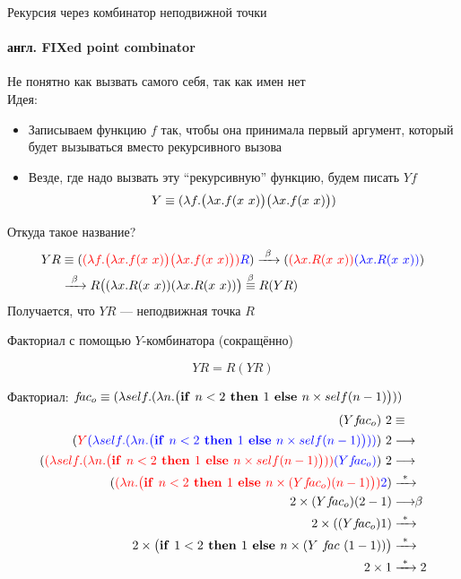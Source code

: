 \newcommand\Y{\ensuremath{Y}}
\begin{frame}{Рекурсия через комбинатор неподвижной точки}
\framesubtitle{англ. FIXed point combinator}
\def\Yimpl{\ensuremath{\lam{f}{\Lam{x}{f(x\ x)}\Lam{x}{f(x\ x)}}}}
Не понятно как вызвать самого себя, так как имен нет\\

Идея:
\begin{itemize}
  \item Записываем функцию $f$ так, чтобы она принимала первый аргумент, который будет вызываться вместо рекурсивного вызова
  \item Везде, где надо вызвать эту \enquote{рекурсивную} функцию, будем писать $Yf$
\vspace{-0.5em}
  {\Large\begin{align*}
     Y\equiv \Yimpl
  \end{align*}}
\end{itemize}

Откуда такое название?
\begin{align*}
YR &\equiv     \redex{\Yimpl}{R} \arrbeta \redex{\lam{x}{R(x\ x)}}{\lam{x}{R(x\ x)}} \\
&\arrbeta  R\big( \lam{x}{R(x\ x)}\lam{x}{R(x\ x)} \big)   \overset{\beta}{\equiv} R(YR)
\end{align*}
Получается, что $YR$ --- неподвижная точка $R$
\end{frame}


\newcommand{\ite}[3]{\ensuremath{\big{(}\text{\textbf{if }} #1\text{\textbf{ then }}#2\text{\textbf{ else }}#3}\big{)}}
\newcommand{\FIX}{\texttt{FIX}}
\newcommand{\self}{\ensuremath{self}}

\begin{frame}{Факториал с помощью $Y$-комбинатора (сокращённо)}
\def\Yfac{\ensuremath{\app{\Y}{f\!ac_o}}}
\vspace{-1.6em}

\newcommand{\FAC}{\ensuremath{\lam{\self}{\lam{n}{ \ite{n<2}{1}{n \times \self(n-1)}}}}}
\[
\Y R = R (\Y R)
\]


Факториал: $f\!ac_o \equiv \FAC$\\

\begin{align*}
  \Yfac\ 2 & \equiv \\
  \redex{\Y}{\FAC}\ 2 & \longrightarrow\\
  \redex{\FAC}{\Yfac}\ 2 & \longrightarrow\\
  \redex{(\lambda n . \ite{n<2}{1}{n \times \Yfac (n-1)})}{2} & \arrmany \\
  2 \times \Yfac (2-1) & \betaarr \\
  2 \times (\Yfac 1) & \arrmany \\
  2 \times \ite{1<2}{1}{n \times (\Y\ f\!ac\ (1-1))} & \arrmany \\
  2 \times 1 & \arrmany 2
\end{align*}
 \end{frame}


